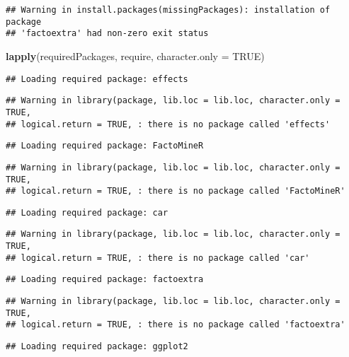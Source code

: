 \documentclass[12pt,]{article}
\newenvironment{Shaded}{\begin{snugshade}}{\end{snugshade}}
\newcommand{\DataTypeTok}[1]{\textcolor[rgb]{0.13,0.29,0.53}{#1}}
\newcommand{\KeywordTok}[1]{\textcolor[rgb]{0.13,0.29,0.53}{\textbf{#1}}}
\newcommand{\NormalTok}[1]{#1}
\newcommand{\OtherTok}[1]{\textcolor[rgb]{0.56,0.35,0.01}{#1}}
\begin{document}
\begin{verbatim}
## Warning in install.packages(missingPackages): installation of package
## 'factoextra' had non-zero exit status
\end{verbatim}

\begin{Shaded}
\begin{Highlighting}[]
\KeywordTok{lapply}\NormalTok{(requiredPackages, require, }\DataTypeTok{character.only =} \OtherTok{TRUE}\NormalTok{)}
\end{Highlighting}
\end{Shaded}

\begin{verbatim}
## Loading required package: effects
\end{verbatim}

\begin{verbatim}
## Warning in library(package, lib.loc = lib.loc, character.only = TRUE,
## logical.return = TRUE, : there is no package called 'effects'
\end{verbatim}

\begin{verbatim}
## Loading required package: FactoMineR
\end{verbatim}

\begin{verbatim}
## Warning in library(package, lib.loc = lib.loc, character.only = TRUE,
## logical.return = TRUE, : there is no package called 'FactoMineR'
\end{verbatim}

\begin{verbatim}
## Loading required package: car
\end{verbatim}

\begin{verbatim}
## Warning in library(package, lib.loc = lib.loc, character.only = TRUE,
## logical.return = TRUE, : there is no package called 'car'
\end{verbatim}

\begin{verbatim}
## Loading required package: factoextra
\end{verbatim}

\begin{verbatim}
## Warning in library(package, lib.loc = lib.loc, character.only = TRUE,
## logical.return = TRUE, : there is no package called 'factoextra'
\end{verbatim}

\begin{verbatim}
## Loading required package: ggplot2
\end{verbatim}
\end{document}

